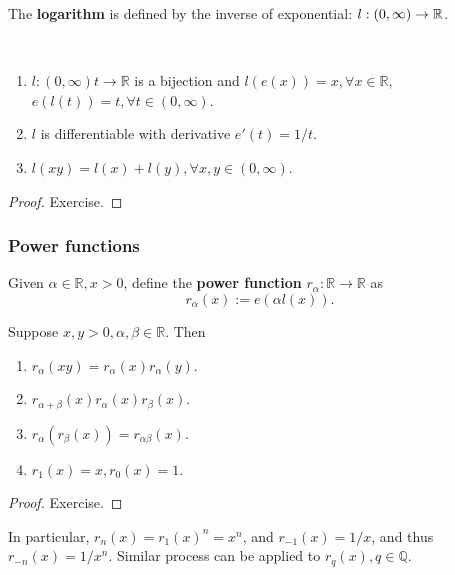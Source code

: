 \begin{definition}
    The \textbf{logarithm} is defined by the inverse of exponential: $ l:(0,\infty )\to {\mathbb{R}}  $.
\end{definition}
\begin{theorem}\label{thm:4.8}\
    \begin{enumerate}
        \item $ l:(0,\infty )t\to \mathbb{R}  $ is a bijection and $ l(e(x))=x, \forall x\in \mathbb{R} $, $ e(l(t))=t,\forall t\in (0,\infty ) $.
        \item $l$ is differentiable with derivative $ e'(t)=1/t $.
        \item $ l(xy)=l(x)+l(y),\forall x,y\in (0,\infty ) $.
    \end{enumerate}
\end{theorem}
\begin{proof}
    Exercise.
\end{proof}

\subsubsection*{Power functions}

\begin{definition}
    Given $ \alpha\in \mathbb{R}, x>0 $, define the \textbf{power function} $ r_\alpha:\mathbb{R} \to \mathbb{R} $ as 
    \[
        r_\alpha(x) := e(\alpha l(x)).
    \]
\end{definition}
\begin{theorem}\label{thm:4.9}
    Suppose $ x,y>0,\alpha,\beta\in \mathbb{R} $. Then 
    \begin{enumerate}
        \item $ r_\alpha(xy)=r_\alpha(x)r_\alpha(y) $.
        \item $ r_{\alpha+\beta}(x)r_\alpha(x)r_\beta(x) $.
        \item $ r_\alpha(r_\beta(x))=r_{\alpha\beta}(x) $.
        \item $ r_1(x)=x,r_0(x)=1 $.
    \end{enumerate}
\end{theorem}
\begin{proof}
    Exercise.
\end{proof}

In particular, $ r_n(x)=r_1(x)^n=x^n $, and $ r_{-1}(x)=1/x $, and thus $ r_{-n}(x)=1/x^n $. Similar process can be applied to $ r_q(x),q\in \mathbb{Q} $.

